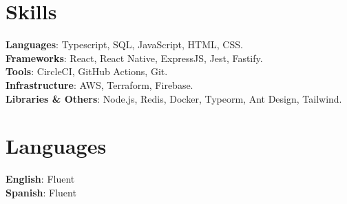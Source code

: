 \documentclass[letterpaper,11pt]{article}
\makeatletter
\newcommand{\resumeSubheading}[4]{
  \vspace{-2pt}\item
    \begin{tabular*}{0.97\textwidth}[t]{l@{\extracolsep{\fill}}r}
      \textbf{#1} & #2 \\
      \textit{\small#3} & \textit{\small #4} \\
    \end{tabular*}\vspace{-7pt}
}
\newcommand{\resumeSimpleSubheading}[2]{
  \vspace{-2pt}\item
    \begin{tabular*}{0.97\textwidth}[t]{l@{\extracolsep{\fill}}r}
      \small\textbf{#1} & #2 \\
    \end{tabular*}\vspace{-7pt}
}
\newcommand{\resumeSubHeadingListStart}{\begin{itemize}[leftmargin=0.15in, label={}]}
\newcommand{\resumeSubHeadingListEnd}{\end{itemize}}
\makeatother
\begin{document}
\begin{minipage}[t]{.78\textwidth}
  \section{Skills}
  \begin{itemize}[leftmargin=0.15in, label={}]
      \small{\item{
      \textbf{Languages}{: Typescript, SQL, JavaScript, HTML, CSS.} \\
      \textbf{Frameworks}{: React, React Native, ExpressJS, Jest, Fastify.} \\
      \textbf{Tools}{: CircleCI, GitHub Actions, Git.} \\
      \textbf{Infrastructure}{: AWS, Terraform, Firebase.} \\
      \textbf{Libraries \& Others}{: Node.js, Redis, Docker, Typeorm, Ant Design, Tailwind.} \\
      }}
  \end{itemize}
\end{minipage}\hspace{.02\textwidth}%
\begin{minipage}[t]{.20\textwidth}
  \section{Languages}
  \begin{itemize}[leftmargin=0.0in, label={}]
      \small{\item{
      \textbf{English}{: Fluent} \\
      \textbf{Spanish}{: Fluent} \\
      }}
  \end{itemize}
\end{minipage}\vspace{-10pt}



\end{document}
